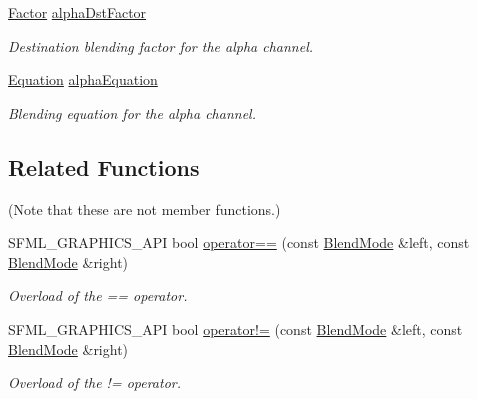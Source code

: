 \begin{DoxyCompactItemize}
\mbox{\label{structsf_1_1_blend_mode_aaf85b6b7943181cc81745569c4851e4e}} 
\mbox{\hyperlink{structsf_1_1_blend_mode_afb9852caf356b53bb0de460c58a9ebbb}{Factor}} \mbox{\hyperlink{structsf_1_1_blend_mode_aaf85b6b7943181cc81745569c4851e4e}{alpha\+Dst\+Factor}}
\begin{DoxyCompactList}\small\item\em Destination blending factor for the alpha channel. \end{DoxyCompactList}\item 
\mbox{\label{structsf_1_1_blend_mode_a68f5a305e0912946f39ba6c9265710c4}} 
\mbox{\hyperlink{structsf_1_1_blend_mode_a7bce470e2e384c4f9c8d9595faef7c32}{Equation}} \mbox{\hyperlink{structsf_1_1_blend_mode_a68f5a305e0912946f39ba6c9265710c4}{alpha\+Equation}}
\begin{DoxyCompactList}\small\item\em Blending equation for the alpha channel. \end{DoxyCompactList}\end{DoxyCompactItemize}
\subsection*{Related Functions}
(Note that these are not member functions.) \begin{DoxyCompactItemize}
\item 
S\+F\+M\+L\+\_\+\+G\+R\+A\+P\+H\+I\+C\+S\+\_\+\+A\+PI bool \mbox{\hyperlink{structsf_1_1_blend_mode_ae13d2e80e55c5263eb9413fde7f74443}{operator==}} (const \mbox{\hyperlink{structsf_1_1_blend_mode}{Blend\+Mode}} \&left, const \mbox{\hyperlink{structsf_1_1_blend_mode}{Blend\+Mode}} \&right)
\begin{DoxyCompactList}\small\item\em Overload of the == operator. \end{DoxyCompactList}\item 
S\+F\+M\+L\+\_\+\+G\+R\+A\+P\+H\+I\+C\+S\+\_\+\+A\+PI bool \mbox{\hyperlink{structsf_1_1_blend_mode_a0c08bfcb9b6911104dcc0c0cddde522a}{operator!=}} (const \mbox{\hyperlink{structsf_1_1_blend_mode}{Blend\+Mode}} \&left, const \mbox{\hyperlink{structsf_1_1_blend_mode}{Blend\+Mode}} \&right)
\begin{DoxyCompactList}\small\item\em Overload of the != operator. \end{DoxyCompactList}\end{DoxyCompactItemize}


